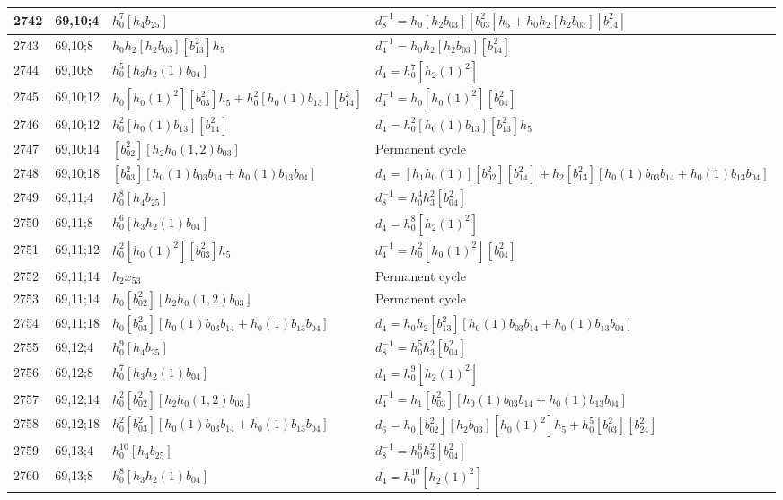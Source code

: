 \documentclass{article}
\begin{document}
\begin{longtable}{|l|l|>{\raggedright\arraybackslash}p{6cm}|>{\raggedright\arraybackslash}p{6cm}|}
\hline
2742 & 69,10;4 & $h_0^7[h_4b_{25}]$ & $d_{8}^{-1}=h_0[h_2b_{03}][b_{03}^2]h_5 + h_0h_2[h_2b_{03}][b_{14}^2]$\\
\hline
2743 & 69,10;8 & $h_0h_2[h_2b_{03}][b_{13}^2]h_5$ & $d_{4}^{-1}=h_0h_2[h_2b_{03}][b_{14}^2]$\\
2744 & 69,10;8 & $h_0^5[h_3h_2(1)b_{04}]$ &$d_{4}=h_0^7[h_2(1)^2]$\\
\hline
2745 & 69,10;12 & $h_0[h_0(1)^2][b_{03}^2]h_5 + h_0^2[h_0(1)b_{13}][b_{14}^2]$ & $d_{4}^{-1}=h_0[h_0(1)^2][b_{04}^2]$\\
2746 & 69,10;12 & $h_0^2[h_0(1)b_{13}][b_{14}^2]$ &$d_{4}=h_0^2[h_0(1)b_{13}][b_{13}^2]h_5$\\
\hline
2747 & 69,10;14 & $[b_{02}^2][h_2h_0(1, 2)b_{03}]$ & Permanent cycle\\
\hline
2748 & 69,10;18 & $[b_{03}^2][h_0(1)b_{03}b_{14} + h_0(1)b_{13}b_{04}]$ &$d_{4}=[h_1h_0(1)][b_{02}^2][b_{14}^2] + h_2[b_{13}^2][h_0(1)b_{03}b_{14} + h_0(1)b_{13}b_{04}]$\\
\hline
2749 & 69,11;4 & $h_0^8[h_4b_{25}]$ & $d_{8}^{-1}=h_0^4h_3^2[b_{04}^2]$\\
\hline
2750 & 69,11;8 & $h_0^6[h_3h_2(1)b_{04}]$ &$d_{4}=h_0^8[h_2(1)^2]$\\
\hline
2751 & 69,11;12 & $h_0^2[h_0(1)^2][b_{03}^2]h_5$ & $d_{4}^{-1}=h_0^2[h_0(1)^2][b_{04}^2]$\\
\hline
2752 & 69,11;14 & $h_2x_{53}$ & Permanent cycle\\
2753 & 69,11;14 & $h_0[b_{02}^2][h_2h_0(1, 2)b_{03}]$ & Permanent cycle\\
\hline
2754 & 69,11;18 & $h_0[b_{03}^2][h_0(1)b_{03}b_{14} + h_0(1)b_{13}b_{04}]$ &$d_{4}=h_0h_2[b_{13}^2][h_0(1)b_{03}b_{14} + h_0(1)b_{13}b_{04}]$\\
\hline
2755 & 69,12;4 & $h_0^9[h_4b_{25}]$ & $d_{8}^{-1}=h_0^5h_3^2[b_{04}^2]$\\
\hline
2756 & 69,12;8 & $h_0^7[h_3h_2(1)b_{04}]$ &$d_{4}=h_0^9[h_2(1)^2]$\\
\hline
2757 & 69,12;14 & $h_0^2[b_{02}^2][h_2h_0(1, 2)b_{03}]$ & $d_{4}^{-1}=h_1[b_{03}^2][h_0(1)b_{03}b_{14} + h_0(1)b_{13}b_{04}]$\\
\hline
2758 & 69,12;18 & $h_0^2[b_{03}^2][h_0(1)b_{03}b_{14} + h_0(1)b_{13}b_{04}]$ &$d_{6}=h_0[b_{02}^2][h_2b_{03}][h_0(1)^2]h_5 + h_0^5[b_{03}^2][b_{24}^2]$\\
\hline
2759 & 69,13;4 & $h_0^{10}[h_4b_{25}]$ & $d_{8}^{-1}=h_0^6h_3^2[b_{04}^2]$\\
\hline
2760 & 69,13;8 & $h_0^8[h_3h_2(1)b_{04}]$ &$d_{4}=h_0^{10}[h_2(1)^2]$\\

\end{longtable}
\end{document}
